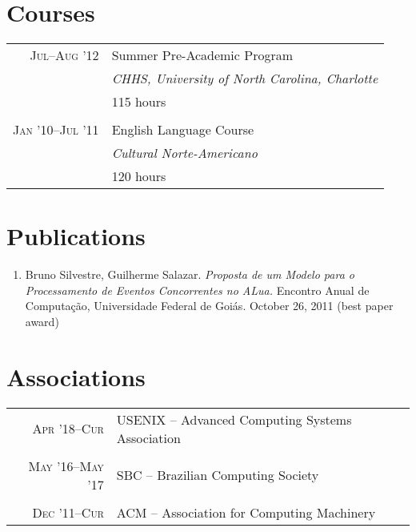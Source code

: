 \documentclass[a4paper,10pt]{article}
\begin{document}
\section{Courses}

\begin{tabular}{r|p{11cm}}

  \textsc{Jul--Aug '12} & Summer Pre-Academic Program\\ &
  \emph{CHHS, University of North Carolina, Charlotte}\\ & 115 hours
  \\\multicolumn{2}{c}{} \\

  \textsc{Jan '10--Jul '11} & English Language Course\\ &
  \emph{Cultural Norte-Americano} \\ & 120 hours\\

\end{tabular}

\section{Publications}
\begin{enumerate}
  \renewcommand{\labelenumi}{[\arabic{enumi}] }
  \item Bruno Silvestre, Guilherme Salazar. \emph{Proposta de um Modelo para o
        Processamento de Eventos Concorrentes no ALua.} Encontro Anual de
        Computação, Universidade Federal de Goiás. October 26, 2011 (best paper
        award)
\end{enumerate}

\section{Associations}

\begin{tabular}{r|p{11cm}}

  \textsc{Apr '18--Cur}
  & USENIX -- Advanced Computing Systems Association \\
  \multicolumn{2}{c}{}\\

  \textsc{May '16--May '17}
  & SBC -- Brazilian Computing Society\\
  \multicolumn{2}{c}{}\\

  \textsc{Dec '11--Cur}
  & ACM -- Association for Computing Machinery\\

\end{tabular}
\end{document}
